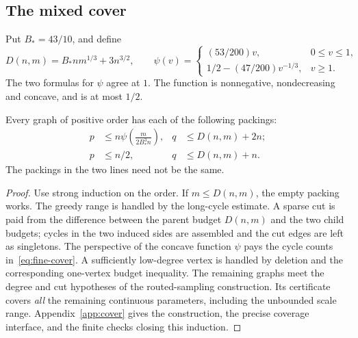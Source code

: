 \subsection{The mixed cover}
Put $B_*=43/10$, and define
\[
 D(n,m)=B_*nm^{1/3}+3n^{3/2},\qquad
 \psi(v)=\begin{cases}(53/200)v,&0\le v\le1,\\
              1/2-(47/200)v^{-1/3},&v\ge1.
              \end{cases}
\]
The two formulas for $\psi$ agree at $1$. The function is nonnegative,
nondecreasing and concave, and is at most $1/2$.

\begin{lemma}\label{lem:mixed}
Every graph of positive order has each of the following packings:
\begin{align}
 p&\le n\psi\left(\frac{m}{2B_*^3n}\right),
       &q&\le D(n,m)+2n;\label{eq:fine-cover}\\
 p&\le n/2,&q&\le D(n,m)+n.\label{eq:coarse-cover}
\end{align}
The packings in the two lines need not be the same.
\end{lemma}
\begin{proof}
Use strong induction on the order. If $m\le D(n,m)$, the empty packing
works. The greedy range is handled by the long-cycle estimate. A sparse
cut is paid from the difference between the parent budget $D(n,m)$ and
the two child budgets; cycles in the two induced sides are assembled and
the cut edges are left as singletons. The perspective of the concave
function $\psi$ pays the cycle counts in~\eqref{eq:fine-cover}.
A sufficiently low-degree vertex is handled by deletion and the corresponding
one-vertex budget inequality. The remaining graphs meet the degree and cut
hypotheses of the routed-sampling construction. Its certificate covers
\emph{all} the remaining continuous parameters, including the unbounded
scale range. Appendix~\ref{app:cover} gives the construction, the precise
coverage interface, and the finite checks closing this induction.
\end{proof}

